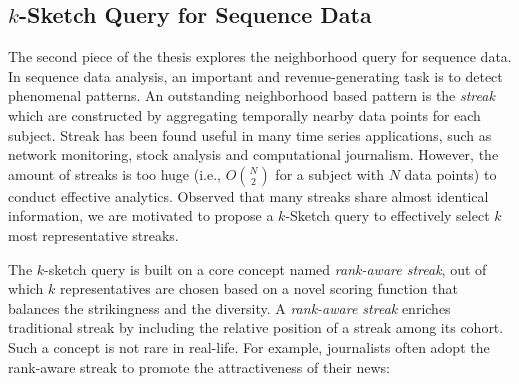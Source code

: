 \subsection{$k$-Sketch Query for Sequence Data}
The second piece of the thesis explores the neighborhood
query for sequence data. 
In sequence data analysis, an important
and revenue-generating task is to detect phenomenal patterns.
An outstanding neighborhood based pattern is the \emph{streak} which are constructed by aggregating
temporally nearby data points for each subject.
%
%
%
%
%
Streak has been found useful in many time series applications,
such as network monitoring, stock analysis
and computational journalism. 
However, the amount of streaks
is too huge (i.e., $O{N \choose 2}$ for a subject with $N$ data points) 
to conduct effective analytics. Observed that
many streaks share almost identical information, we are motivated 
to propose a $k$-Sketch
query to effectively select $k$ most representative streaks.

The $k$-sketch query is built on a core concept named \emph{rank-aware streak},
out of which $k$ representatives are 
chosen based on a novel scoring function
that balances the strikingness and the diversity. A \emph{rank-aware streak}
enriches traditional streak by including the
relative position of a streak among its cohort.
Such a concept is not rare in real-life.
For example, journalists often adopt the rank-aware streak to promote
the attractiveness of their news:


